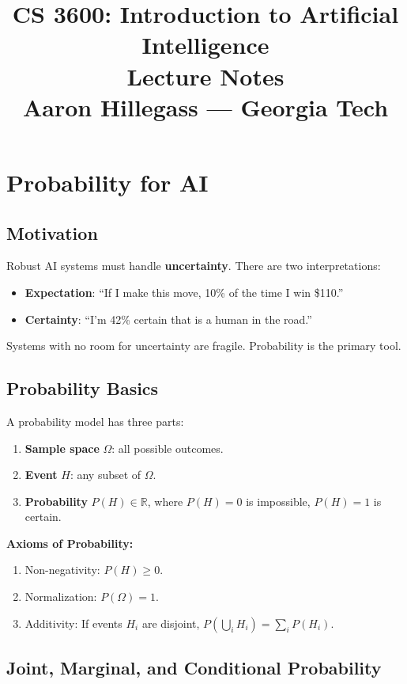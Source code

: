 \documentclass[11pt]{article}
\title{\textbf{CS 3600: Introduction to Artificial Intelligence}\\[0.5em]
\large Lecture Notes\\[0.3em]
\normalsize Aaron Hillegass --- Georgia Tech}
\date{}
\begin{document}
\maketitle
\tableofcontents
\newpage

\section{Probability for AI}

\subsection{Motivation}
Robust AI systems must handle \textbf{uncertainty}. There are two interpretations:
\begin{itemize}
  \item \textbf{Expectation}: ``If I make this move, 10\% of the time I win \$110.''
  \item \textbf{Certainty}: ``I'm 42\% certain that is a human in the road.''
\end{itemize}
Systems with no room for uncertainty are fragile. Probability is the primary tool.

\subsection{Probability Basics}
A probability model has three parts:
\begin{enumerate}
  \item \textbf{Sample space} $\Omega$: all possible outcomes.
  \item \textbf{Event} $H$: any subset of $\Omega$.
  \item \textbf{Probability} $P(H) \in \mathbb{R}$, where $P(H)=0$ is impossible, $P(H)=1$ is certain.
\end{enumerate}

\textbf{Axioms of Probability:}
\begin{enumerate}
  \item Non-negativity: $P(H) \geq 0$.
  \item Normalization: $P(\Omega) = 1$.
  \item Additivity: If events $H_i$ are disjoint, $P\!\left(\bigcup_i H_i\right) = \sum_i P(H_i)$.
\end{enumerate}

\subsection{Joint, Marginal, and Conditional Probability}
\end{document}
